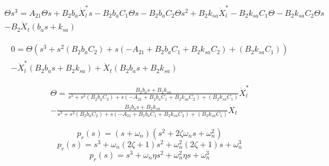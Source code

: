 \documentclass{article}
\begin{document}
            \begin{equation}
                \begin{split}
                \Theta s^3 =  A_{21} \Theta s + B_{2}b_a \dot{X}_l^* s- B_{2}b_a C_1 \Theta s -B_{2}b_a C_2 \Theta s^2 + B_{2}k_{sa} \dot{X}_l^* - B_{2}k_{sa} C_1 \Theta - B_{2}k_{sa} C_2 \Theta s \\
                - B_{2}\dot{X}_t\left(b_a s+k_{sa}\right)
                \end{split}
            \end{equation}

            \begin{equation}
                \begin{split}
                0= \Theta \left( s^3 + s^2 \left(B_{2}b_a C_2\right) + s \left(-A_{21} +B_{2}b_a C_1 +B_{2}k_{sa} C_2 \right) + \left( B_{2}k_{sa} C_1 \right) \right)\\
                - \dot{X}_l^*\left(B_{2}b_a s + B_{2}k_{sa}\right) +\dot{X}_t\left(B_{2}b_a s+B_{2}k_{sa}\right)   
                \end{split}
            \end{equation}


            \begin{equation}
                \begin{split}
                    \Theta= \frac{B_{2}b_a s + B_{2}k_{sa}}{s^3 + s^2 \left(B_{2}b_a C_2\right) + s \left(-A_{21} +B_{2}b_a C_1 +B_{2}k_{sa} C_2 \right) + \left( B_{2}k_{sa} C_1 \right)} \dot{X}_l^*\\
                    - \frac{B_{2}b_a s+B_{2}k_{sa}}{s^3 + s^2 \left(B_{2}b_a C_2\right) + s \left(-A_{21} +B_{2}b_a C_1 +B_{2}k_{sa} C_2 \right) + \left( B_{2}k_{sa} C_1 \right)} \dot{X}_t
                \end{split}
            \end{equation}

            \begin{equation}
                p_r(s)=(s+\omega_n)(s^2+2\zeta\omega_n s+\omega_n^2)
            \end{equation}
            \begin{equation}
                p_r(s)=s^3+\omega_n(2\zeta+1)s^2+\omega_n^2(2\zeta+1)s +\omega_n^3
            \end{equation}
            \begin{equation}
                p_r(s)=s^3+\omega_n \eta s^2+\omega_n^2 \eta s +\omega_n^3
            \end{equation}
\end{document}
